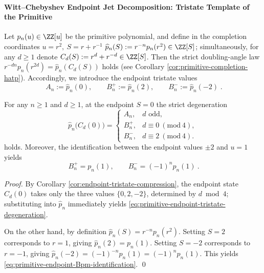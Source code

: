\paragraph{Witt--Chebyshev Endpoint Jet Decomposition: Tristate Template of the Primitive}
Let \(p_n(u)\in\ZZ[u]\) be the primitive polynomial, and define in the completion coordinates \(u=r^2,\ S=r+r^{-1}\)
\(\widehat p_n(S):=r^{-n}p_n(r^2)\in\ZZ[S]\);
simultaneously, for any \(d\ge 1\) denote \(C_d(S):=r^d+r^{-d}\in\ZZ[S]\).
Then the strict doubling-angle law \(r^{-dn}p_n(r^{2d})=\widehat p_n(C_d(S))\) holds (see Corollary \ref{cor:primitive-completion-hatp}).
Accordingly, we introduce the endpoint tristate values
\begin{equation}\label{eq:primitive-endpoint-tristate-values}
\boxed{\;
A_n:=\widehat p_n(0),\qquad
B_n^{+}:=\widehat p_n(2),\qquad
B_n^{-}:=\widehat p_n(-2)\; }.
\end{equation}

\begin{proposition}\label{prop:primitive-endpoint-tristate-degeneration}
For any \(n\ge 1\) and \(d\ge 1\), at the endpoint \(S=0\) the strict degeneration
\begin{equation}\label{eq:primitive-endpoint-tristate-degeneration}
\boxed{\;
\widehat p_n\!\bigl(C_d(0)\bigr)=
\begin{cases}
A_n, & d \text{ odd},\\
B_n^{+}, & d\equiv 0\ (\mathrm{mod}\ 4),\\
B_n^{-}, & d\equiv 2\ (\mathrm{mod}\ 4).
\end{cases}\;}
\end{equation}
holds. Moreover, the identification between the endpoint values \(\pm 2\) and \(u=1\) yields
\begin{equation}\label{eq:primitive-endpoint-Bpm-identification}
\boxed{\ B_n^{+}=p_n(1),\qquad B_n^{-}=(-1)^n p_n(1)\ }.
\end{equation}
\end{proposition}
\begin{proof}
By Corollary \ref{cor:endpoint-tristate-compression}, the endpoint state \(C_d(0)\) takes only the three values \(\{0,2,-2\}\), determined by \(d\bmod 4\); substituting into \(\widehat p_n\) immediately yields \eqref{eq:primitive-endpoint-tristate-degeneration}.
\par
On the other hand, by definition \(\widehat p_n(S)=r^{-n}p_n(r^2)\). Setting \(S=2\) corresponds to \(r=1\), giving \(\widehat p_n(2)=p_n(1)\).
Setting \(S=-2\) corresponds to \(r=-1\), giving \(\widehat p_n(-2)=(-1)^{-n}p_n(1)=(-1)^n p_n(1)\).
This yields \eqref{eq:primitive-endpoint-Bpm-identification}. \qed
\end{proof}

